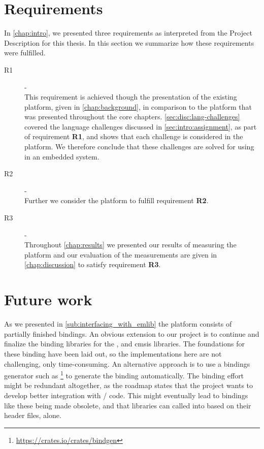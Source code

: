 \section{Requirements}

In \autoref{chap:intro}, we presented three requirements as interpreted from the Project Description for this thesis.
In this section we summarize how these requirements were fulfilled.

\begin{description}
    \item[R1] - {{\reqi}} \hfill \\
    This requirement is achieved though the presentation of the existing {\C} platform, given in \autoref{chap:background}, in comparison to the {\rust} platform that was presented throughout the core chapters.
    \autoref{sec:disc:lang-challenges} covered the language challenges discussed in \autoref{sec:intro:assignment}, as part of requirement \textbf{R1}, and shows that each challenge is considered in the {\rg} platform.
    We therefore conclude that these challenges are solved for using {\rust} in an embedded system.

    \item[R2] - {{\reqii}} \hfill \\
    Further we consider the {\rg} platform to fulfill requirement \textbf{R2}.

    \item[R3] - {{\reqiii}} \hfill \\
    Throughout \autoref{chap:results} we presented our results of measuring the {\rg} platform and our evaluation of the measurements are given in \autoref{chap:discussion} to satisfy requirement \textbf{R3}.
\end{description}

\section{Future work}
\label{chap:future}

As we presented in \autoref{sub:interfacing_with_emlib} the platform consists of partially finished bindings.
An obvious extension to our project is to continue and finalize the binding libraries for the {\emlib}, {\emdrv} and \gls{cmsis} libraries.
The foundations for these binding have been laid out, so the implementations here are not challenging, only time-consuming.
An alternative approach is to use a bindings generator such as \footnote{\url{https://crates.io/crates/bindgen}} to generate the binding automatically.
The binding effort might be redundant altogether, as the {\rust} roadmap \cite{web:roadmap} states that the project wants to develop better integration with {\C}/{\Cpp} code.
This might eventually lead to bindings like these being made obsolete, and that {\C} libraries can called into based on their header files, alone.

